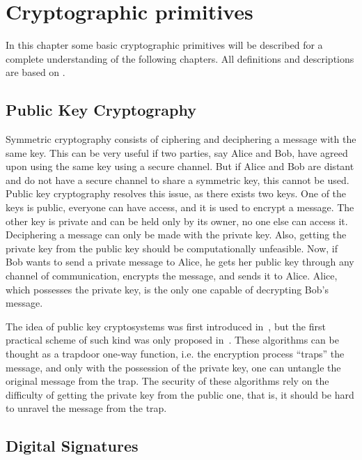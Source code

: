 \documentclass{ufsctex/ufsctex}
\begin{document}
\chapter{Cryptographic primitives}

In this chapter some basic cryptographic primitives will be described for a
complete understanding of the following chapters. All definitions and
descriptions are based on \cite{stinson2005cryptography}.

\section{Public Key Cryptography}

Symmetric cryptography consists of ciphering and deciphering a message with the
same key. This can be very useful if two parties, say Alice and Bob, have
agreed upon using the same key using a secure channel. But if Alice and Bob are
distant and do not have a secure channel to share a symmetric key, this cannot
be used. Public key cryptography resolves this issue, as there exists two keys.
One of the keys is public, everyone can have access, and it is used to encrypt
a message. The other key is private and can be held only by its owner, no one
else can access it. Deciphering a message can only be made with the private
key. Also, getting the private key from the public key should be
computationally unfeasible. Now, if Bob wants to send a private message to
Alice, he gets her public key through any channel of communication, encrypts
the message, and sends it to Alice. Alice, which possesses the private key, is
the only one capable of decrypting Bob's message.

The idea of public key cryptosystems was first introduced
in~\cite{diffie1976new}, but the first practical scheme of such kind was only
proposed in~\cite{rivest1977digital}. These algorithms can be thought as a
trapdoor one-way function, i.e. the encryption process ``traps'' the message,
and only with the possession of the private key, one can untangle the original
message from the trap. The security of these algorithms rely on the difficulty
of getting the private key from the public one, that is, it should be hard to
unravel the message from the trap.

\section{Digital Signatures}
\end{document}
